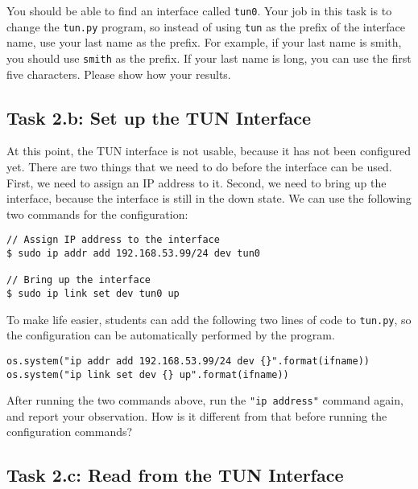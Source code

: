 You should be able to find an interface called \texttt{tun0}. Your job 
in this task is to change the \texttt{tun.py} program, so 
instead of using \texttt{tun}  as the prefix of the interface name, use
your last name as the prefix. For example, if your last name is smith, 
you should use \texttt{smith} as the prefix.  If your last name is long,
you can use the first five characters. Please show how your results. 
 


\subsection{Task 2.b: Set up the TUN Interface}


At this point, the TUN interface is not usable, because it has not been configured yet. 
There are two things that we need to do before the interface can be used. First, we 
need to assign an IP address to it. Second, we need to bring up the interface, because
the interface is still in the down state. We can use the following two commands
for the configuration: 


\begin{lstlisting}
// Assign IP address to the interface 
$ sudo ip addr add 192.168.53.99/24 dev tun0

// Bring up the interface
$ sudo ip link set dev tun0 up
\end{lstlisting}
 

To make life easier, students can add the following two lines of code
to \texttt{tun.py}, so the configuration can be automatically
performed by the program. 


\begin{lstlisting}
os.system("ip addr add 192.168.53.99/24 dev {}".format(ifname)) 
os.system("ip link set dev {} up".format(ifname))              
\end{lstlisting}



After running the two commands above, run the \texttt{"ip address"} command 
again, and report your observation. How is it different from
that before running the configuration commands?



\subsection{Task 2.c: Read from the TUN Interface}


